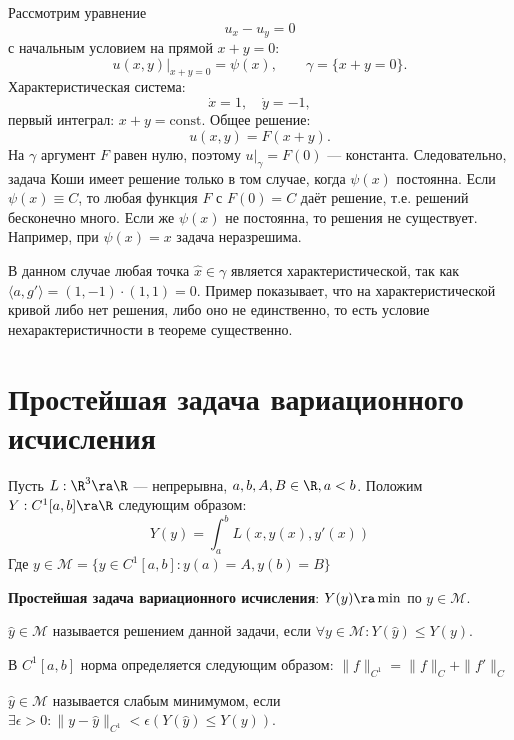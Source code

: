 \begin{example}
    Рассмотрим уравнение
    \[
    u_x - u_y = 0
    \]
    с начальным условием на прямой \(x+y=0\):
    \[
    u(x,y)\big|_{x+y=0} = \psi(x),\qquad \gamma = \{x+y=0\}.
    \]
    Характеристическая система:
    \[
    \dot x = 1,\quad \dot y = -1,
    \]
    первый интеграл: \(x+y = \text{const}\). Общее решение:
    \[
    u(x,y) = F(x+y).
    \]
    На \(\gamma\) аргумент \(F\) равен нулю, поэтому \(u|_\gamma = F(0)\) — константа. Следовательно, задача Коши имеет решение только в том случае, когда \(\psi(x)\) постоянна. Если \(\psi(x)\equiv C\), то любая функция \(F\) с \(F(0)=C\) даёт решение, т.е. решений бесконечно много. Если же \(\psi(x)\) не постоянна, то решения не существует. Например, при \(\psi(x)=x\) задача неразрешима.
    
    В данном случае любая точка \(\hat{x}\in\gamma\) является характеристической, так как \(\langle a, g'\rangle = (1,-1)\cdot(1,1)=0\). Пример показывает, что на характеристической кривой либо нет решения, либо оно не единственно, то есть условие нехарактеристичности в теореме существенно.
\end{example}


\section{Простейшая задача вариационного исчисления}

Пусть \(L: \R^3 \ra \R\) --- непрерывна, \(a, b, A, B \in \R, a < b\). Положим \(Y: C^1[a, b] \ra \R\) следующим образом:
\[Y(y) = \int_a^b L(x, y(x), y'(x))\]
Где \(y \in \mathcal{M} = \{y \in C^1[a, b]: y(a) = A, y(b) = B\}\)

\noindent\textbf{Простейшая задача вариационного исчисления}: \(Y(y) \ra \min\) по \(y \in \mathcal{M}\).

\begin{definition}
    \(\hat{y} \in \mathcal{M}\) называется решением данной задачи, если \(\forall y \in \mathcal{M}: Y(\hat{y}) \le Y(y)\).
\end{definition}

\begin{definition}
    В \(C^1[a, b]\) норма определяется следующим образом: \(\|f\|_{C^1} = \|f\|_C + \|f'\|_C\)
\end{definition}

\begin{definition}
    \(\hat{y} \in \mathcal{M}\) называется слабым минимумом, если \(\exists \epsilon > 0: \|y - \hat{y}\|_{C^1} < \epsilon (Y(\hat{y}) \le Y(y))\).
\end{definition}

